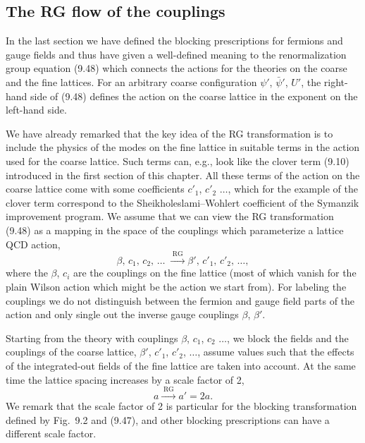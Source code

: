 \subsection{The RG flow of the couplings}
\label{sec:9.3.2}

In the last section we have defined the blocking prescriptions for fermions
and gauge fields and thus have given a well-defined meaning to the
renormalization group equation (9.48) which connects the actions for the
theories on the coarse and the fine lattices. For an arbitrary coarse
configuration $\psi'$, $\bar\psi'$, $U'$, the right-hand side of (9.48)
defines the action on the coarse lattice in the exponent on the left-hand
side.

We have already remarked that the key idea of the RG transformation is to
include the physics of the modes on the fine lattice in suitable terms in the
action used for the coarse lattice. Such terms can, e.g., look like the clover
term (9.10) introduced in the first section of this chapter. All these terms
of the action on the coarse lattice come with some coefficients $c'_1$, $c'_2$
$\ldots$, which for the example of the clover term correspond to the
Sheikholeslami--Wohlert coefficient of the Symanzik improvement program. We
assume that we can view the RG transformation (9.48) as a mapping in the space
of the couplings which parameterize a lattice QCD action,
\begin{equation}
  \beta,\,c_1,\,c_2,\,\ldots\;\xrightarrow{\;\mathrm{RG}\;}
    \beta',\,c'_1,\,c'_2,\,\ldots ,
\end{equation}
where the $\beta$, $c_i$ are the couplings on the fine lattice (most of which
vanish for the plain Wilson action which might be the action we start from).
For labeling the couplings we do not distinguish between the fermion and gauge
field parts of the action and only single out the inverse gauge couplings
$\beta$, $\beta'$.

Starting from the theory with couplings $\beta$, $c_1$, $c_2$ $\ldots$, we
block the fields and the couplings of the coarse lattice, $\beta'$, $c'_1$,
$c'_2$, $\ldots$, assume values such that the effects of the integrated-out
fields of the fine lattice are taken into account. At the same time the
lattice spacing increases by a scale factor of 2,
\begin{equation}
  a \xrightarrow{\;\mathrm{RG}\;} a' = 2a .
\end{equation}
We remark that the scale factor of 2 is particular for the blocking
transformation defined by Fig.~9.2 and (9.47), and other blocking
prescriptions can have a different scale factor.

